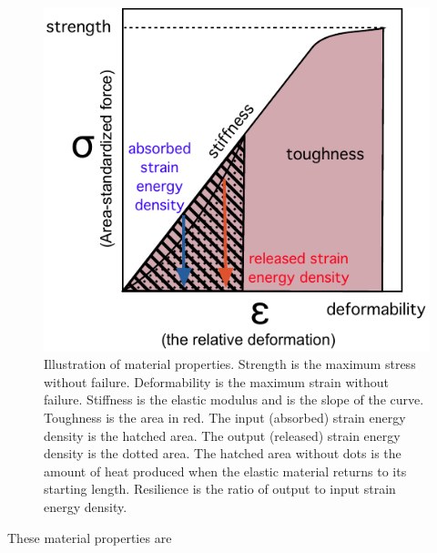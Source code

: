 \documentclass[]{book}
\begin{document}
\begin{figure}
\centering
\includegraphics{images/materials_chapter/stress_strain_I.pdf}
\caption{\label{fig:unnamed-chunk-13}Illustration of material properties.
Strength is the maximum stress without failure. Deformability is the
maximum strain without failure. Stiffness is the elastic modulus and is
the slope of the curve. Toughness is the area in red. The input
(absorbed) strain energy density is the hatched area. The output
(released) strain energy density is the dotted area. The hatched area
without dots is the amount of heat produced when the elastic material
returns to its starting length. Resilience is the ratio of output to
input strain energy density.}
\end{figure}

These material properties are
\end{document}
